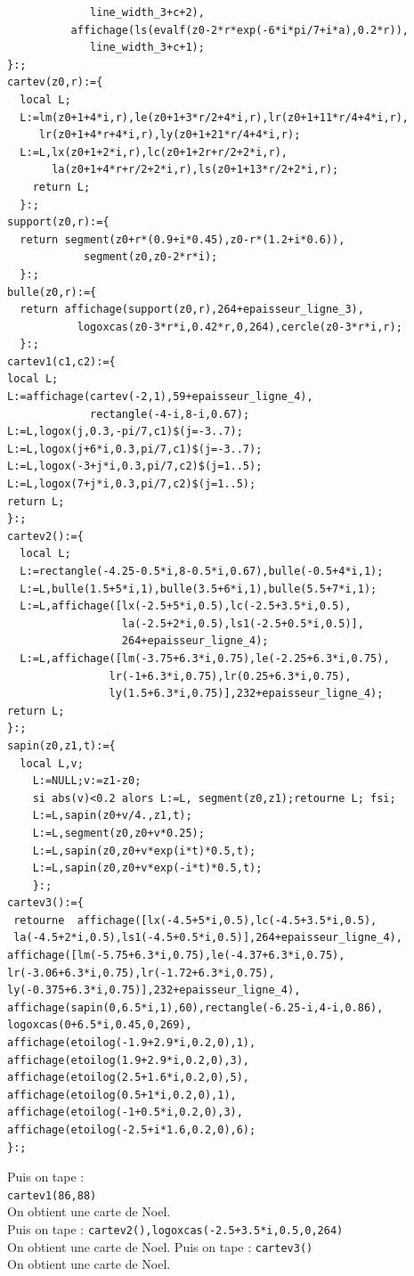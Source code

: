 \documentclass[a4paper,11pt]{book}
\begin{document}
\begin{verbatim}
             line_width_3+c+2),
          affichage(ls(evalf(z0-2*r*exp(-6*i*pi/7+i*a),0.2*r)),
             line_width_3+c+1);
}:;
cartev(z0,r):={
  local L;
  L:=lm(z0+1+4*i,r),le(z0+1+3*r/2+4*i,r),lr(z0+1+11*r/4+4*i,r),
     lr(z0+1+4*r+4*i,r),ly(z0+1+21*r/4+4*i,r);
  L:=L,lx(z0+1+2*i,r),lc(z0+1+2r+r/2+2*i,r),
       la(z0+1+4*r+r/2+2*i,r),ls(z0+1+13*r/2+2*i,r);
    return L;
  }:;
support(z0,r):={
  return segment(z0+r*(0.9+i*0.45),z0-r*(1.2+i*0.6)),
            segment(z0,z0-2*r*i);
  }:;
bulle(z0,r):={
  return affichage(support(z0,r),264+epaisseur_ligne_3),
           logoxcas(z0-3*r*i,0.42*r,0,264),cercle(z0-3*r*i,r);
  }:;
cartev1(c1,c2):={
local L;
L:=affichage(cartev(-2,1),59+epaisseur_ligne_4),
             rectangle(-4-i,8-i,0.67);
L:=L,logox(j,0.3,-pi/7,c1)$(j=-3..7);
L:=L,logox(j+6*i,0.3,pi/7,c1)$(j=-3..7);
L:=L,logox(-3+j*i,0.3,pi/7,c2)$(j=1..5);
L:=L,logox(7+j*i,0.3,pi/7,c2)$(j=1..5);
return L;
}:;
cartev2():={
  local L;
  L:=rectangle(-4.25-0.5*i,8-0.5*i,0.67),bulle(-0.5+4*i,1);
  L:=L,bulle(1.5+5*i,1),bulle(3.5+6*i,1),bulle(5.5+7*i,1);
  L:=L,affichage([lx(-2.5+5*i,0.5),lc(-2.5+3.5*i,0.5),
                  la(-2.5+2*i,0.5),ls1(-2.5+0.5*i,0.5)],
                  264+epaisseur_ligne_4);
  L:=L,affichage([lm(-3.75+6.3*i,0.75),le(-2.25+6.3*i,0.75),
                lr(-1+6.3*i,0.75),lr(0.25+6.3*i,0.75),
                ly(1.5+6.3*i,0.75)],232+epaisseur_ligne_4);
return L;
}:;
sapin(z0,z1,t):={
  local L,v;
    L:=NULL;v:=z1-z0;
    si abs(v)<0.2 alors L:=L, segment(z0,z1);retourne L; fsi;
    L:=L,sapin(z0+v/4.,z1,t);
    L:=L,segment(z0,z0+v*0.25);
    L:=L,sapin(z0,z0+v*exp(i*t)*0.5,t);
    L:=L,sapin(z0,z0+v*exp(-i*t)*0.5,t); 
    }:;
cartev3():={
 retourne  affichage([lx(-4.5+5*i,0.5),lc(-4.5+3.5*i,0.5),
 la(-4.5+2*i,0.5),ls1(-4.5+0.5*i,0.5)],264+epaisseur_ligne_4),
affichage([lm(-5.75+6.3*i,0.75),le(-4.37+6.3*i,0.75),
lr(-3.06+6.3*i,0.75),lr(-1.72+6.3*i,0.75),
ly(-0.375+6.3*i,0.75)],232+epaisseur_ligne_4),
affichage(sapin(0,6.5*i,1),60),rectangle(-6.25-i,4-i,0.86),
logoxcas(0+6.5*i,0.45,0,269),
affichage(etoilog(-1.9+2.9*i,0.2,0),1),
affichage(etoilog(1.9+2.9*i,0.2,0),3),
affichage(etoilog(2.5+1.6*i,0.2,0),5),
affichage(etoilog(0.5+1*i,0.2,0),1),
affichage(etoilog(-1+0.5*i,0.2,0),3),
affichage(etoilog(-2.5+i*1.6,0.2,0),6);
}:;
\end{verbatim}
Puis on tape :
\ \\
{\tt cartev1(86,88)}\\
On obtient une carte de Noel.\\
Puis on tape :
{\tt cartev2(),logoxcas(-2.5+3.5*i,0.5,0,264)}\\
On obtient une carte de Noel.
Puis on tape :
{\tt cartev3()}\\
On obtient une carte de Noel.\\
\end{document}
